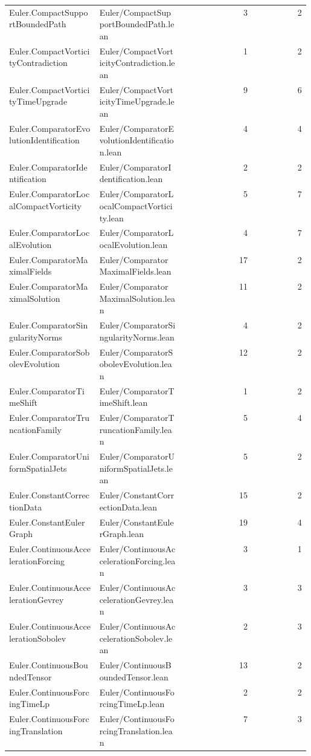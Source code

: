\begin{longtable}{p{0.30\linewidth}p{0.28\linewidth}rr}
Euler.CompactSupportBoundedPath & Euler/CompactSupportBoundedPath.lean & 3 & 2\\
Euler.CompactVorticityContradiction & Euler/CompactVorticityContradiction.lean & 1 & 2\\
Euler.CompactVorticityTimeUpgrade & Euler/CompactVorticityTimeUpgrade.lean & 9 & 6\\
Euler.ComparatorEvolutionIdentification & Euler/ComparatorEvolutionIdentification.lean & 4 & 4\\
Euler.ComparatorIdentification & Euler/ComparatorIdentification.lean & 2 & 2\\
Euler.ComparatorLocalCompactVorticity & Euler/ComparatorLocalCompactVorticity.lean & 5 & 7\\
Euler.ComparatorLocalEvolution & Euler/ComparatorLocalEvolution.lean & 4 & 7\\
Euler.ComparatorMaximalFields & Euler/ComparatorMaximalFields.lean & 17 & 2\\
Euler.ComparatorMaximalSolution & Euler/ComparatorMaximalSolution.lean & 11 & 2\\
Euler.ComparatorSingularityNorms & Euler/ComparatorSingularityNorms.lean & 4 & 2\\
Euler.ComparatorSobolevEvolution & Euler/ComparatorSobolevEvolution.lean & 12 & 2\\
Euler.ComparatorTimeShift & Euler/ComparatorTimeShift.lean & 1 & 2\\
Euler.ComparatorTruncationFamily & Euler/ComparatorTruncationFamily.lean & 5 & 4\\
Euler.ComparatorUniformSpatialJets & Euler/ComparatorUniformSpatialJets.lean & 5 & 2\\
Euler.ConstantCorrectionData & Euler/ConstantCorrectionData.lean & 15 & 2\\
Euler.ConstantEulerGraph & Euler/ConstantEulerGraph.lean & 19 & 4\\
Euler.ContinuousAccelerationForcing & Euler/ContinuousAccelerationForcing.lean & 3 & 1\\
Euler.ContinuousAccelerationGevrey & Euler/ContinuousAccelerationGevrey.lean & 3 & 3\\
Euler.ContinuousAccelerationSobolev & Euler/ContinuousAccelerationSobolev.lean & 2 & 3\\
Euler.ContinuousBoundedTensor & Euler/ContinuousBoundedTensor.lean & 13 & 2\\
Euler.ContinuousForcingTimeLp & Euler/ContinuousForcingTimeLp.lean & 2 & 2\\
Euler.ContinuousForcingTranslation & Euler/ContinuousForcingTranslation.lean & 7 & 3\\

\end{longtable}
